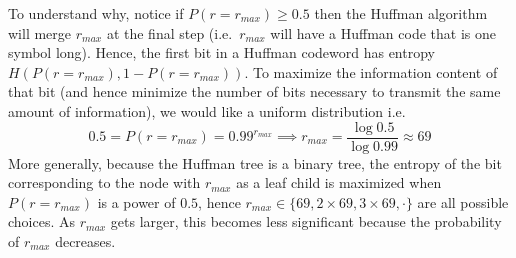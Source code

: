 \documentclass[11pt]{article}
\begin{document}
  To understand why, notice if $P(r=r_{max}) \geq 0.5$ then the Huffman
  algorithm will merge $r_{max}$ at the final step (i.e.\ $r_{max}$ will have a
  Huffman code that is one symbol long). Hence, the first bit in a Huffman
  codeword has entropy $H(P(r=r_{max}), 1 - P(r=r_{max}))$. To maximize the
  information content of that bit (and hence minimize the number of bits
  necessary to transmit the same amount of information), we would like a
  uniform distribution i.e.
  \[
    0.5 = P(r=r_{max}) = 0.99^{r_{max}} \implies r_{max} = \frac{\log 0.5}{\log 0.99} \approx 69
  \]
  More generally, because the Huffman tree is a binary tree, the entropy of the
  bit corresponding to the node with $r_{max}$ as a leaf child is maximized
  when $P(r=r_{max})$ is a power of $0.5$, hence $r_{max} \in \{69, 2 \times
  69, 3 \times 69, \cdot\}$ are all possible choices. As $r_{max}$ gets larger,
  this becomes less significant because the probability of $r_{max}$ decreases.





\nocite{*} %

\end{document}
